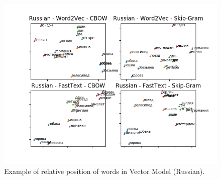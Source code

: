 \documentclass{article}
\begin{document}
\begin{figure}
    \centering
    \includegraphics[width=\textwidth]{imgs/embedding_ru.png}
    \caption{Example of relative position of words in Vector Model (Russian).}
    \label{fig:embedding_ru}
\end{figure}
\end{document}
